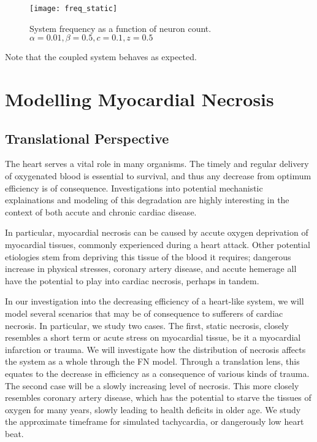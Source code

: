 \documentclass[11pt]{report}
\begin{document}
\begin{figure}[!ht]
  \caption{System frequency as a function of neuron count. $\alpha = 0.01, \beta = 0.5,c = 0.1,z=0.5$ }
  \centering
    \texttt{[image: freq\_static]}
\end{figure}

Note that the coupled system behaves as expected. 




\chapter{Modelling Myocardial Necrosis} 


\section{Translational Perspective} %

The heart serves a vital role in many organisms. The timely and regular delivery of oxygenated blood is essential to survival, and thus any decrease from optimum efficiency is of consequence. Investigations into potential mechanistic explainations and modeling of this degradation are highly interesting in the context of both accute and chronic cardiac disease.

In particular, myocardial necrosis can be caused by accute oxygen deprivation of myocardial tissues, commonly experienced during a heart attack. Other potential etiologies stem from depriving this tissue of the blood it requires; dangerous increase in physical stresses, coronary artery disease, and accute hemerage all have the potential to play into cardiac necrosis, perhaps in tandem. 

In our investigation into the decreasing efficiency of a heart-like system, we will model several scenarios that may be of consequence to sufferers of cardiac necrosis. In particular, we study two cases. The first, static necrosis, closely resembles a short term or acute stress on myocardial tissue, be it a myocardial infarction or trauma. We will investigate how the distribution of necrosis affects the system as a whole through the FN model. Through a translation lens, this equates to the decrease in efficiency as a consequence of various kinds of trauma. The second case will be a slowly increasing level of necrosis. This more closely resembles coronary artery disease, which has the potential to starve the tissues of oxygen for many years, slowly leading to health deficits in older age. We study the approximate timeframe for simulated tachycardia, or dangerously low heart beat. 
\end{document}
